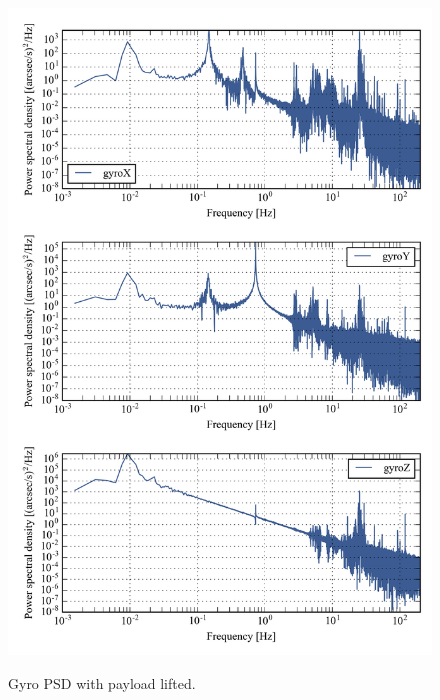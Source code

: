 \begin{figure}[!h]
\begin{center}
\includegraphics{Figures/lifted_400.png}
\label{fig:multiPSD400_lifted}
\caption[Gyro PSD with payload lifted]{Gyro PSD with payload lifted.}
\end{center}
\end{figure}


